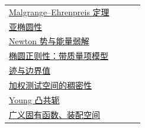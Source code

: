 \begin{longtable}{p{0.80\linewidth}r}
\hyperref[sec:yosida-06-10]{Malgrange--Ehrenpreis 定理} & \pageref{sec:yosida-06-10}\\
\hyperref[sec:yosida-06-12]{亚椭圆性} & \pageref{sec:yosida-06-12}\\
\hyperref[ch:pde]{Newton 势与能量弱解} & \pageref{ch:pde}\\
\hyperref[prop:topic-bessel-inverse]{椭圆正则性：带质量项模型} & \pageref{prop:topic-bessel-inverse}\\
\hyperref[prop:supp-trace]{迹与边界值} & \pageref{prop:supp-trace}\\
\hyperref[prop:weighted-density]{加权测试空间的稠密性} & \pageref{prop:weighted-density}\\
\hyperref[eq:young-conjugate]{Young 凸共轭} & \pageref{eq:young-conjugate}\\
\hyperref[eq:generalized-expansion]{广义固有函数、装配空间} & \pageref{eq:generalized-expansion}\\
\bottomrule
\end{longtable}

